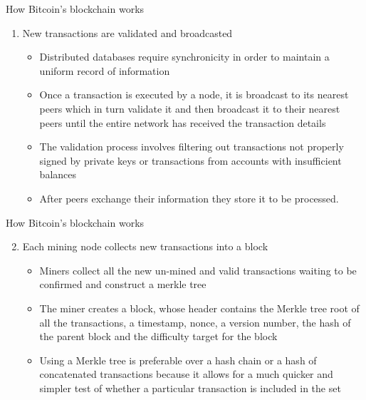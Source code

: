 \documentclass[11pt]{beamer}
\begin{document}

\begin{frame}{How Bitcoin's blockchain works}
	\begin{enumerate}
		\item New transactions are validated and broadcasted
			\begin{itemize}
				\item Distributed databases require synchronicity in order to maintain a uniform record of information
				\item Once a transaction is executed by a node, it is broadcast to its nearest peers which in turn validate it and then broadcast it to their nearest peers until the entire network has received the transaction details
				\item The validation process involves filtering out transactions not properly signed by private keys or transactions from accounts with insufficient balances
				\item After peers exchange their information they store it to be processed.
			\end{itemize}
	\end{enumerate}
\end{frame}


\begin{frame}{How Bitcoin's blockchain works}
	\begin{enumerate}
		\setcounter{enumi}{1}
		\item Each mining node collects new transactions into a block
		\begin{itemize}
			\item Miners collect all the new un-mined and valid transactions waiting to be confirmed and construct a merkle tree
			\item The miner creates a block, whose header contains the Merkle tree root of all the transactions, a timestamp, nonce, a version number, the hash of the parent block and the difficulty target for the block
			\item Using a Merkle tree is preferable over a hash chain or a hash of concatenated transactions because it allows for a much quicker and simpler test of whether a particular transaction is included in the set
		\end{itemize}
	\end{enumerate}
\end{frame}
\end{document}
